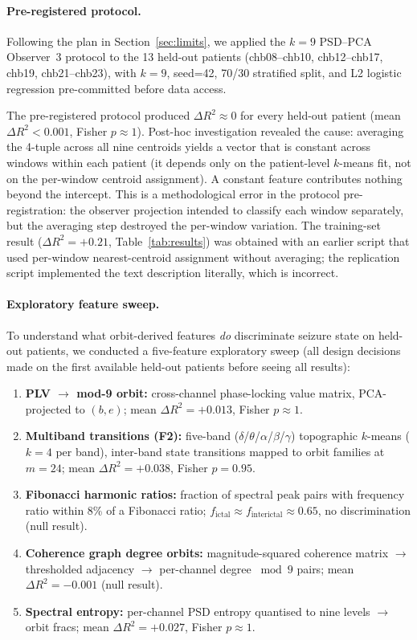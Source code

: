 \documentclass[11pt]{article}
\begin{document}
\paragraph{Pre-registered protocol.}
Following the plan in Section~\ref{sec:limits}, we applied the $k=9$ PSD--PCA
Observer~3 protocol to the 13 held-out patients
(chb08--chb10, chb12--chb17, chb19, chb21--chb23),
with $k=9$, seed=42, 70/30 stratified split, and L2 logistic regression
pre-committed before data access.

The pre-registered protocol produced $\Delta R^2 \approx 0$ for every held-out
patient (mean $\Delta R^2 < 0.001$, Fisher $p \approx 1$).
Post-hoc investigation revealed the cause: averaging the 4-tuple across all
nine centroids yields a vector that is constant across windows within each
patient (it depends only on the patient-level $k$-means fit, not on the
per-window centroid assignment).  A constant feature contributes nothing
beyond the intercept.  This is a methodological error in the protocol
pre-registration: the observer projection intended to classify each window
separately, but the averaging step destroyed the per-window variation.
The training-set result ($\Delta R^2 = +0.21$, Table~\ref{tab:results})
was obtained with an earlier script that used per-window nearest-centroid
assignment without averaging; the replication script implemented the text
description literally, which is incorrect.

\paragraph{Exploratory feature sweep.}
To understand what orbit-derived features \emph{do} discriminate seizure state
on held-out patients, we conducted a five-feature exploratory sweep (all
design decisions made on the first available held-out patients before seeing
all results):

\begin{enumerate}[label=(\arabic*)]
  \item \textbf{PLV $\to$ mod-9 orbit:} cross-channel phase-locking value
        matrix, PCA-projected to $(b,e)$; mean $\Delta R^2 = +0.013$, Fisher $p \approx 1$.
  \item \textbf{Multiband transitions (F2):} five-band ($\delta$/$\theta$/$\alpha$/$\beta$/$\gamma$)
        topographic $k$-means ($k=4$ per band), inter-band state transitions mapped to
        orbit families at $m=24$; mean $\Delta R^2 = +0.038$, Fisher $p = 0.95$.
  \item \textbf{Fibonacci harmonic ratios:} fraction of spectral peak pairs with
        frequency ratio within 8\% of a Fibonacci ratio; $f_\text{ictal} \approx f_\text{interictal} \approx 0.65$,
        no discrimination (null result).
  \item \textbf{Coherence graph degree orbits:} magnitude-squared coherence matrix
        $\to$ thresholded adjacency $\to$ per-channel degree $\bmod 9$ pairs;
        mean $\Delta R^2 = -0.001$ (null result).
  \item \textbf{Spectral entropy:} per-channel PSD entropy quantised to nine levels
        $\to$ orbit fracs; mean $\Delta R^2 = +0.027$, Fisher $p \approx 1$.
\end{enumerate}
\end{document}
